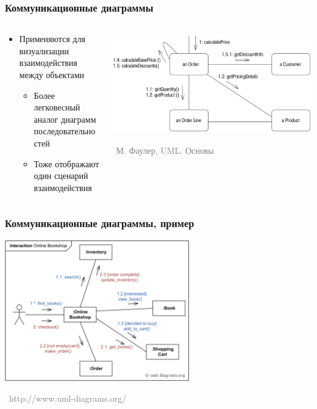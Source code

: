 \documentclass[xetex,mathserif,serif]{beamer}
\newcommand{\attribution}[1] {
	\vspace{-5mm}\begin{flushright}\begin{scriptsize}\textcolor{gray}{\textcopyright\, #1}\end{scriptsize}\end{flushright}
}
\begin{document}
	\begin{frame}
		\frametitle{Коммуникационные диаграммы}
		\begin{columns}
			\begin{column}{0.5\textwidth}
				\begin{itemize}
					\item Применяются для визуализации взаимодействия между объектами
					\begin{itemize}
						\item Более легковесный аналог диаграмм последовательностей
						\item Тоже отображают один сценарий взаимодействия
					\end{itemize}
				\end{itemize}
			\end{column}
			\begin{column}{0.5\textwidth}
				\begin{center}
					\includegraphics[width=\textwidth]{communicationDiagram.png}
					\attribution{М. Фаулер, UML. Основы}
				\end{center}
			\end{column}
		\end{columns}
	\end{frame}

	\begin{frame}
		\frametitle{Коммуникационные диаграммы, пример}
		\begin{center}
			\includegraphics[width=0.6\textwidth]{communicationDiagramExample.png}
			\attribution{http://www.uml-diagrams.org/}
		\end{center}
	\end{frame}
\end{document}
